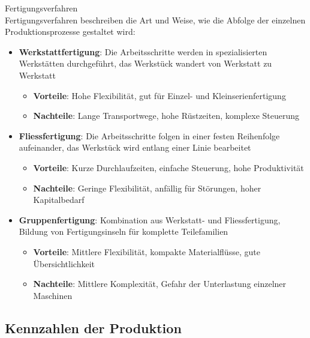 \begin{definition}{Fertigungsverfahren}\\
Fertigungsverfahren beschreiben die Art und Weise, wie die Abfolge der einzelnen Produktionsprozesse gestaltet wird:
\begin{itemize}
    \item \textbf{Werkstattfertigung}: Die Arbeitsschritte werden in spezialisierten Werkstätten durchgeführt, das Werkstück wandert von Werkstatt zu Werkstatt
    \begin{itemize}
        \item \textbf{Vorteile}: Hohe Flexibilität, gut für Einzel- und Kleinserienfertigung
        \item \textbf{Nachteile}: Lange Transportwege, hohe Rüstzeiten, komplexe Steuerung
    \end{itemize}
    \item \textbf{Fliessfertigung}: Die Arbeitsschritte folgen in einer festen Reihenfolge aufeinander, das Werkstück wird entlang einer Linie bearbeitet
    \begin{itemize}
        \item \textbf{Vorteile}: Kurze Durchlaufzeiten, einfache Steuerung, hohe Produktivität
        \item \textbf{Nachteile}: Geringe Flexibilität, anfällig für Störungen, hoher Kapitalbedarf
    \end{itemize}
    \item \textbf{Gruppenfertigung}: Kombination aus Werkstatt- und Fliessfertigung, Bildung von Fertigungsinseln für komplette Teilefamilien
    \begin{itemize}
        \item \textbf{Vorteile}: Mittlere Flexibilität, kompakte Materialflüsse, gute Übersichtlichkeit
        \item \textbf{Nachteile}: Mittlere Komplexität, Gefahr der Unterlastung einzelner Maschinen
    \end{itemize}
\end{itemize}
\end{definition}

\subsection{Kennzahlen der Produktion}

